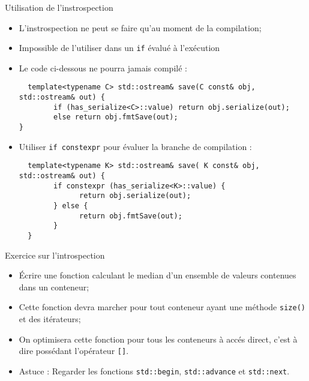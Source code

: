 \documentclass[compress,10pt,aspectratio=169]{beamer}
\begin{document}
  \begin{frame}[fragile]{Utilisation de l'instrospection}
  \scriptsize
  
  \begin{itemize}
  \item L'instrospection ne peut se faire qu'au moment de la compilation;
  \item Impossible de l'utiliser dans un \texttt{if} évalué à l'exécution
  \item Le code ci-dessous ne pourra jamais compilé :
  \begin{verbatim}
  template<typename C> std::ostream& save(C const& obj, std::ostream& out) {
        if (has_serialize<C>::value) return obj.serialize(out);
        else return obj.fmtSave(out);                                           }
  \end{verbatim}
  \item Utiliser \texttt{if constexpr} pour évaluer la branche de compilation :
  \begin{verbatim}
  template<typename K> std::ostream& save( K const& obj, std::ostream& out) {
        if constexpr (has_serialize<K>::value) {
              return obj.serialize(out);
        } else {
              return obj.fmtSave(out);
        }
  }        
  \end{verbatim}
  \end{itemize}
  \end{frame}
  
\begin{frame}[fragile]{Exercice sur l'introspection}
  \scriptsize
  \begin{itemize}
  \item \'Ecrire une fonction calculant le median d'un ensemble de valeurs contenues 
        dans un conteneur;
  \item Cette fonction devra marcher pour tout conteneur ayant une méthode 
        \texttt{size()} et des itérateurs;
  \item On optimisera cette fonction pour tous les conteneurs à accés direct, 
        c'est à dire possédant l'opérateur \texttt{[]}.
  \item \alert{Astuce} : Regarder les fonctions \texttt{std::begin}, 
        \texttt{std::advance} et \texttt{std::next}.
  \end{itemize}
  \end{frame}
  
\end{document}
